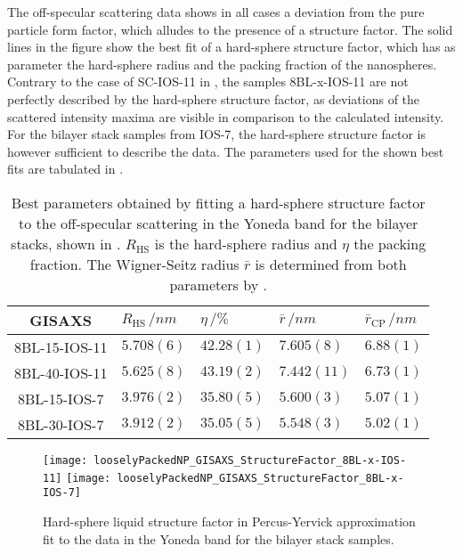 \documentclass[\main/dresen_thesis.tex]{subfiles}
\begin{document}
  The off-specular scattering data shows in all cases a deviation from the pure particle form factor, which alludes to the presence of a structure factor.
  The solid lines in the figure show the best fit of a hard-sphere structure factor, which has as parameter the hard-sphere radius and the packing fraction of the nanospheres.
  Contrary to the case of SC-IOS-11 in , the samples 8BL-x-IOS-11 are not perfectly described by the hard-sphere structure factor, as deviations of the scattered intensity maxima are visible in comparison to the calculated intensity.
  For the bilayer stack samples from IOS-7, the hard-sphere structure factor is however sufficient to describe the data.
  The parameters used for the shown best fits are tabulated in .

  \begin{table}[tb]
    \centering
    \caption{\label{tab:looselyPackedNP:bilayerStacks:gisaxs}Best parameters obtained by fitting a hard-sphere structure factor to the off-specular scattering in the Yoneda band for the bilayer stacks, shown in . $R_\mathrm{HS}$ is the hard-sphere radius and $\eta$ the packing fraction. The Wigner-Seitz radius $\bar{r}$ is determined from both parameters by .}
    \begin{tabular}{ c | l | l | l | l }
      \rule{0pt}{2ex} \textbf{GISAXS}  & $R_\mathrm{HS} \, / \unit{nm}$ &$\eta \, / \unit{\%}$ & $\bar{r} \, / \unit{nm}$ & $\bar{r}_\mathrm{CP} \, / \unit{nm}$ \\
      \hline
      \rule{0pt}{2ex} 8BL-15-IOS-11    & $5.708(6)$    & $42.28(1)$ & $7.605(8)$  & $6.88(1)$\\
      \rule{0pt}{2ex} 8BL-40-IOS-11    & $5.625(8)$    & $43.19(2)$ & $7.442(11)$ & $6.73(1)$\\
      \rule{0pt}{2ex} 8BL-15-IOS-7     & $3.976(2)$    & $35.80(5)$ & $5.600(3)$  & $5.07(1)$\\
      \rule{0pt}{2ex} 8BL-30-IOS-7     & $3.912(2)$    & $35.05(5)$ & $5.548(3)$  & $5.02(1)$\\
      \hline
    \end{tabular}
  \end{table}

  \begin{figure}[tb]
    \centering
    \texttt{[image: looselyPackedNP\_GISAXS\_StructureFactor\_8BL-x-IOS-11]}
    \texttt{[image: looselyPackedNP\_GISAXS\_StructureFactor\_8BL-x-IOS-7]}
    \caption{\label{fig:looselyPackedNP:bilayerStacks:gisaxsHardSphereSF}Hard-sphere liquid structure factor in Percus-Yervick approximation fit to the data in the Yoneda band for the bilayer stack samples.}
  \end{figure}
\end{document}
